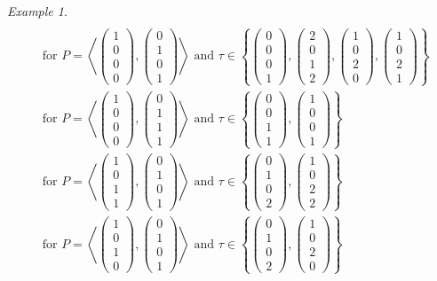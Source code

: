 \documentclass{amsart}
\newcommand{\vect}[1]{\left( \begin{smallmatrix} #1 \end{smallmatrix} \right)}
\newcommand{\plan}[2]{\left< \vect{ #1 }, \vect{ #2 } \right>}
\theoremstyle{plain}
\theoremstyle{definition}
\theoremstyle{remark}
\newtheorem{example}[theorem]{Example}
\begin{document}
\begin{example}
\begin{align}
\\
&\text{for } P=\plan{1\\0\\0\\0}{0\\1\\0\\1} \text{ and } \tau \in \left\{ \vect{0\\0\\0\\1},\vect{2\\0\\1\\2},\vect{1\\0\\2\\0},\vect{1\\0\\2\\1} \right\}
\\
&\text{for } P=\plan{1\\0\\0\\0}{0\\1\\1\\1} \text{ and } \tau \in \left\{ \vect{0\\0\\1\\1},\vect{1\\0\\0\\1} \right\}
\\
&\text{for } P=\plan{1\\0\\1\\1}{0\\1\\0\\1} \text{ and } \tau \in \left\{ \vect{0\\1\\0\\2},\vect{1\\0\\2\\2} \right\}
\\
&\text{for } P=\plan{1\\0\\1\\0}{0\\1\\0\\1} \text{ and } \tau \in \left\{ \vect{0\\1\\0\\2},\vect{1\\0\\2\\0} \right\}

\end{align}
\end{example}
\end{document}
